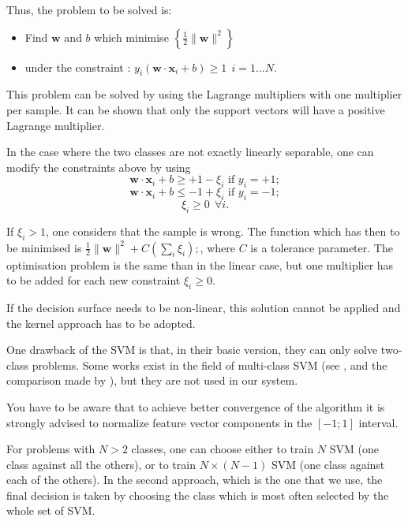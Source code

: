     Thus, the problem to be solved is:

	\begin{itemize}
	\item Find $\mathbf{w}$ and $b$ which minimise
	 $\left\{ \frac{1}{2}\|\mathbf{w}\|^2 \right\}$
	\item under the constraint :
	 $y_i(\mathbf{w}\cdot\mathbf{x}_i+b)\ge 1~  ~ i=1\ldots N.$
	\end{itemize}

	This problem can be solved by using the Lagrange multipliers
	with one multiplier per sample. It can be shown that only the
	support vectors will have a positive Lagrange multiplier.

	In the case where the two classes are not exactly linearly
	separable, one can modify the constraints above by using 
      $$\mathbf{w}\cdot\mathbf{x}_i+b\ge +1 - \xi_i \text{ if }y_i=+1;$$
    $$\mathbf{w}\cdot\mathbf{x}_i+b\le -1+\xi_i \text{ if }y_i=-1;$$
    $$\xi_i\ge 0~  ~\forall i.$$

	If $\xi_i > 1$, one considers that the sample is wrong. The
	function which has then to be minimised is
	$\frac{1}{2}\|\mathbf{w}\|^2 + C\left( \sum_i \xi_i\right); $,
	where $C$ is a tolerance parameter. The optimisation problem
	is the same than in the linear case, but one multiplier has to
	be added for each new constraint $\xi_i\ge 0$.

	If the decision surface needs to be non-linear, this solution
	cannot be applied and the kernel approach has to be adopted.


One drawback of the SVM is that, in their basic version, they can only
solve two-class problems. Some works exist in the field of multi-class
SVM (see \cite{allwein00reducing,weston98multiclass}, and the
comparison made by \cite{hsu01comparison}), but they are
not used in our system.

You have to be aware that to achieve better convergence of the algorithm it is 
strongly advised to normalize feature vector components in the $[-1;1]$ 
interval.

For problems with $N > 2$ classes, one can choose either to train $N$
SVM (one class against all the others), or to train $N\times(N-1)$ SVM
(one class against each of the others). In the second approach, which
is the one that we use, the final decision is taken by choosing the
class which is most often selected by the whole set of SVM.


